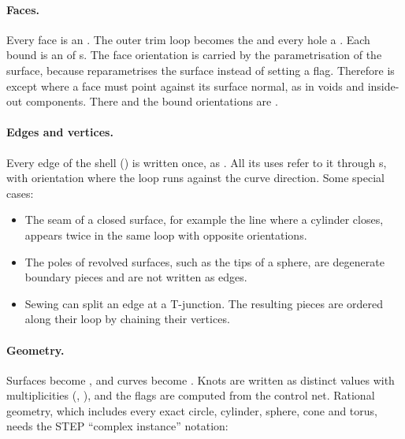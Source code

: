 \paragraph{Faces.} Every face is an . The
outer trim loop becomes the  and every hole a . Each
bound is an  of s. The face orientation is carried by the
parametrisation of the surface, because  reparametrises the
surface instead of setting a flag. Therefore  is  except where a
face must point against its surface normal, as in voids and inside-out components. There
 and the bound orientations are .

{\raggedright \paragraph{Edges and vertices.} Every edge of the shell () is written once, as
. All its uses refer to it through
s, with orientation  where the loop runs against the curve
direction. Some special cases:\par}
\begin{itemize}
  \item The seam of a closed surface, for example the line where a cylinder closes, appears
    twice in the same loop with opposite orientations.
  \item The poles of revolved surfaces, such as the tips of a sphere, are degenerate boundary
    pieces and are not written as edges.
  \item Sewing can split an edge at a T-junction. The resulting pieces are ordered along their
    loop by chaining their vertices.
\end{itemize}

\paragraph{Geometry.} Surfaces become , and curves become
. Knots are written as distinct values with multiplicities
(, ), and the  flags are
computed from the control net. Rational geometry, which includes every exact circle, cylinder,
sphere, cone and torus, needs the STEP ``complex instance'' notation:


